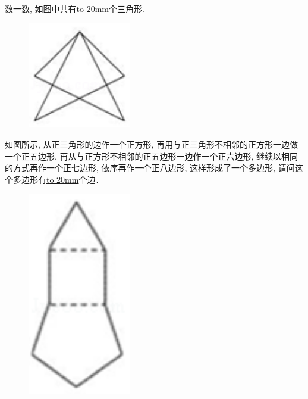 \item {
    数一数, 如图中共有\underline{\hbox to 20mm{}}个三角形.
    \begin{figure}[H] 
        \centering
        \includegraphics[width=0.4\textwidth]{./pics/Chapter_6/2015_2.png}
    \end{figure}
}

\item {
    如图所示, 从正三角形的边作一个正方形, 再用与正三角形不相邻的正方形一边做一个正五边形, 再从与正方形不相邻的正五边形一边作一个正六边形, 继续以相同的方式再作一个正七边形, 依序再作一个正八边形, 这样形成了一个多边形, 请问这个多边形有\underline{\hbox to 20mm{}}个边．
    \begin{figure}[H] 
        \centering
        \includegraphics[width=0.4\textwidth]{./pics/Chapter_6/2015_3.png}
    \end{figure}
}


